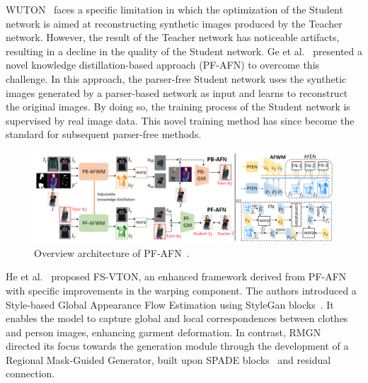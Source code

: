 WUTON~\cite{Issenhuth-ECCV2020-Do} faces a specific limitation in which the optimization of the Student network is aimed at reconstructing synthetic images produced by the Teacher network. However, the result of the Teacher network has noticeable artifacts, resulting in a decline in the quality of the Student network. Ge et al.~\cite{Ge-CVPR2021-Parser} presented a novel knowledge distillation-based approach (PF-AFN) to overcome this challenge.  In this approach, the parser-free Student network uses the synthetic images generated by a parser-based network as input and learns to reconstruct the original images. By doing so, the training process of the Student network is supervised by real image data. This novel training method has since become the standard for subsequent parser-free methods.

\begin{figure}[h!]
    \centering
    \includegraphics[width=\linewidth]{content/resources/images/literature-review/pfafn.png}
    \caption{Overview architecture of PF-AFN~\cite{Ge-CVPR2021-Parser}.}
    \label{fig:vton-pfafn}
\end{figure}

He et al.~\cite{He-CVPR2022-Style} proposed FS-VTON, an enhanced framework derived from PF-AFN~\cite{Ge-CVPR2021-Parser} with specific improvements in the warping component. The authors introduced a Style-based Global Appearance Flow Estimation using StyleGan blocks~\cite{Karras-CVPR2019-Style}. It enables the model to capture global and local correspondences between clothes and person images, enhancing garment deformation. In contrast, RMGN~\cite{Lin-IJCAI2022-RMGN} directed its focus towards the generation module through the development of a Regional Mask-Guided Generator, built upon SPADE blocks~\cite{Park-CVPR2019-Semantic} and residual connection.


